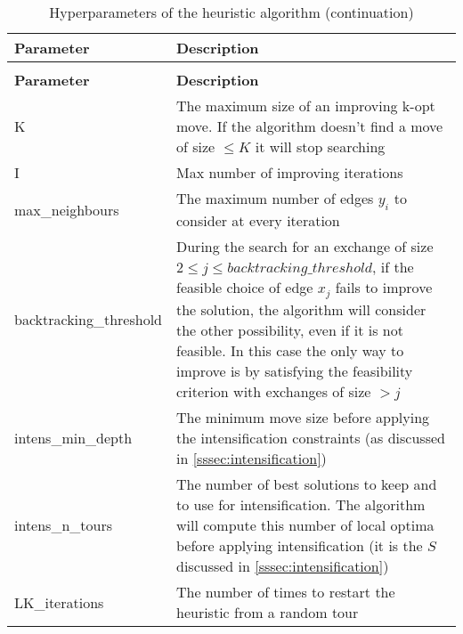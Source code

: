 
\renewcommand{\arraystretch}{1.5}
\setlength{\arrayrulewidth}{1.2pt}
\begin{longtable}{lX}
	\caption{Parameters of the heuristic algorithm}\\
	\hline
	\rowcolor{myred} %
	\color{white}\textbf{Parameter} & \color{white}\textbf{Description}\\
	\hline
	\endfirsthead
	
	\rowcolor{white}
	\caption[]{Hyperparameters of the heuristic algorithm (continuation)}\\
	\hline
	\rowcolor{myred}
	\color{white}\textbf{Parameter} & \color{white}\textbf{Description}\\
	\hline
	\endhead
	\hline %
	\endlastfoot %
	K  & The maximum size of an improving k-opt move. If the algorithm doesn't find a move of size $\le K$ it will stop searching  \\
	I  & Max number of improving iterations \\
	max\_neighbours   & The maximum number of edges $y_i$ to consider at every iteration \\
	backtracking\_threshold & During the search for an exchange of size $2 \le j \le backtracking\_threshold$, if the feasible choice of edge $x_j$ fails to improve the solution, the algorithm will consider the other possibility, even if it is not feasible. In this case the only way to improve is by satisfying the feasibility criterion with exchanges of size $> j$\\
	intens\_min\_depth & The minimum move size before applying the intensification constraints (as discussed in \cref{sssec:intensification})\\
	intens\_n\_tours & The number of best solutions to keep and to use for intensification. The algorithm will compute this number of local optima before applying intensification  (it is the $S$ discussed in \cref{sssec:intensification})\\
	LK\_iterations & The number of times to restart the heuristic from a random tour
	\label{tab:hyperparameters} \\
\end{longtable}
\setlength{\arrayrulewidth}{1pt}
\renewcommand{\arraystretch}{1}